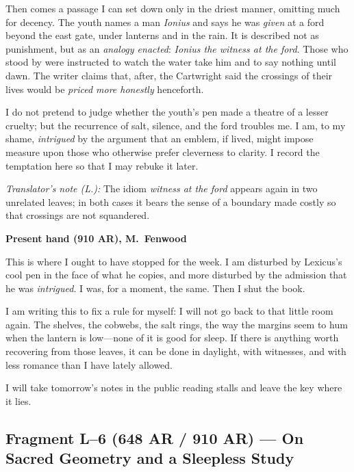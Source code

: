 \documentclass[11pt]{article}
\begin{document}
Then comes a passage I can set down only in the driest manner, omitting much for decency. The youth names a man \textit{Ionius} and says he was \emph{given} at a ford beyond the east gate, under lanterns and in the rain. It is described not as punishment, but as an \emph{analogy enacted}: \textit{Ionius the witness at the ford}. Those who stood by were instructed to watch the water take him and to say nothing until dawn. The writer claims that, after, the Cartwright said the crossings of their lives would be \emph{priced more honestly} henceforth.

I do not pretend to judge whether the youth’s pen made a theatre of a lesser cruelty; but the recurrence of salt, silence, and the ford troubles me. I am, to my shame, \emph{intrigued} by the argument that an emblem, if lived, might impose measure upon those who otherwise prefer cleverness to clarity. I record the temptation here so that I may rebuke it later.

\medskip
\noindent\textit{Translator’s note (L.):} The idiom \textit{witness at the ford} appears again in two unrelated leaves; in both cases it bears the sense of a boundary made costly so that crossings are not squandered.

\medskip
\noindent\textbf{Present hand (910 AR), M.\ Fenwood}

This is where I ought to have stopped for the week. I am disturbed by Lexicus’s cool pen in the face of what he copies, and more disturbed by the admission that he was \emph{intrigued}. I was, for a moment, the same. Then I shut the book.

I am writing this to fix a rule for myself: I will not go back to that little room again. The shelves, the cobwebs, the salt rings, the way the margins seem to hum when the lantern is low—none of it is good for sleep. If there is anything worth recovering from those leaves, it can be done in daylight, with witnesses, and with less romance than I have lately allowed. 

I will take tomorrow’s notes in the public reading stalls and leave the key where it lies.

\subsection{Fragment L--6 (648 AR / 910 AR) --- On Sacred Geometry and a Sleepless Study}
\label{frag:l6}
{}
\end{document}
